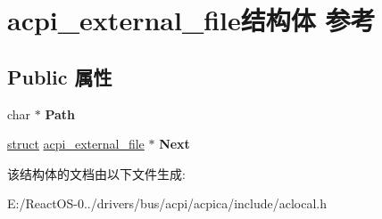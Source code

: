 \hypertarget{structacpi__external__file}{}\section{acpi\+\_\+external\+\_\+file结构体 参考}
\label{structacpi__external__file}
\subsection*{Public 属性}
\begin{DoxyCompactItemize}
\item 
\mbox{\label{structacpi__external__file_a8bb3c508c4dd746cec70a5a2abf95782}} 
char $\ast$ {\bfseries Path}
\item 
\mbox{\label{structacpi__external__file_a624a18bb73e9be6406136d298aa089a2}} 
\hyperlink{interfacestruct}{struct} \hyperlink{structacpi__external__file}{acpi\+\_\+external\+\_\+file} $\ast$ {\bfseries Next}
\end{DoxyCompactItemize}


该结构体的文档由以下文件生成\+:\begin{DoxyCompactItemize}
\item 
E\+:/\+React\+O\+S-\/0../drivers/bus/acpi/acpica/include/aclocal.\+h\end{DoxyCompactItemize}
